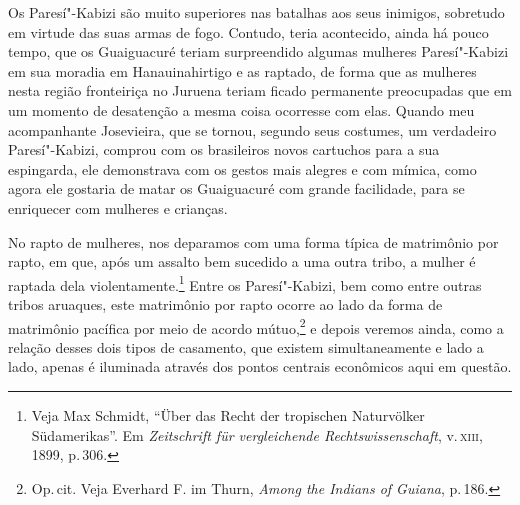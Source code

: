 Os Paresí"-Kabizi são muito superiores nas batalhas aos seus inimigos, sobretudo em virtude
das suas armas de fogo. Contudo, teria acontecido, ainda há pouco
tempo, que os Guaiguacuré teriam surpreendido algumas mulheres Paresí"-Kabizi
em sua moradia em Hanauinahirtigo e as raptado, de forma que as
mulheres nesta região fronteiriça no Juruena teriam ficado permanente
preocupadas que em um momento de desatenção a mesma coisa ocorresse com
elas. Quando meu acompanhante Josevieira, que se tornou, segundo seus
costumes, um verdadeiro Paresí"-Kabizi, comprou com os brasileiros novos
cartuchos para a sua espingarda, ele demonstrava com os gestos mais
alegres e com mímica, como agora ele gostaria de matar os Guaiguacuré
com grande facilidade, para se enriquecer com mulheres e crianças.

{No rapto de mulheres, nos deparamos com uma forma típica de matrimônio
por rapto, em que, após um assalto bem sucedido a uma outra tribo, a
mulher é raptada dela violentamente.\footnote{Veja Max Schmidt, ``Über
  das Recht der tropischen Naturvölker Südamerikas''. Em \textit{Zeitschrift für
  vergleichende Rechtswissenschaft}, v.\,\textsc{xiii}, 1899, p.\,306.} Entre os
Paresí"-Kabizi, bem como entre outras tribos aruaques, este matrimônio por
rapto ocorre ao lado da forma de matrimônio pacífica por meio de acordo
mútuo,\footnote{Op.\,cit. Veja Everhard F. im Thurn, \textit{Among the
  Indians of Guiana}, p.\,186.} e depois veremos ainda, como a relação
desses dois tipos de casamento, que existem simultaneamente e lado a
lado, apenas é iluminada através dos pontos centrais econômicos aqui em
questão.}

